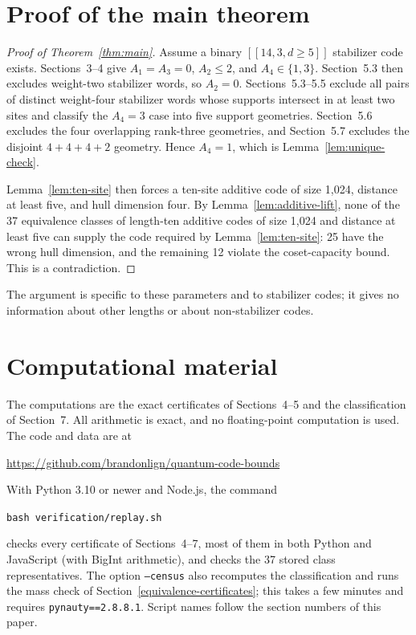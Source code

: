 \documentclass[11pt]{article}
\begin{document}
\section{Proof of the main theorem}\label{discussion-and-conclusion}

\begin{proof}[Proof of Theorem~\ref{thm:main}]
Assume a binary \(\left[\!\left[14,3,d\geq 5\right]\!\right]\) stabilizer code exists. Sections~3--4 give \(A_{1}=A_{3}=0\), \(A_{2}\leq2\), and \(A_{4}\in\{1,3\}\). Section~5.3 then excludes weight-two stabilizer words, so \(A_{2}=0\). Sections~5.3--5.5 exclude all pairs of distinct weight-four stabilizer words whose supports intersect in at least two sites and classify the \(A_4=3\) case into five support geometries. Section~5.6 excludes the four overlapping rank-three geometries, and Section~5.7 excludes the disjoint \(4+4+4+2\) geometry. Hence \(A_{4}=1\), which is Lemma~\ref{lem:unique-check}.

Lemma~\ref{lem:ten-site} then forces a ten-site additive code of size 1,024, distance at least five, and hull dimension four. By Lemma~\ref{lem:additive-lift}, none of the 37 equivalence classes of length-ten additive codes of size 1,024 and distance at least five can supply the code required by Lemma~\ref{lem:ten-site}: 25 have the wrong hull dimension, and the remaining 12 violate the coset-capacity bound. This is a contradiction.
\end{proof}

The argument is specific to these parameters and to stabilizer codes; it gives no information about other lengths or about non-stabilizer codes.

\section{Computational material}\label{computational-material}

The computations are the exact certificates of Sections~4--5 and the classification of Section~7. All arithmetic is exact, and no floating-point computation is used. The code and data are at
\begin{center}
\url{https://github.com/brandonlign/quantum-code-bounds}
\end{center}
With Python 3.10 or newer and Node.js, the command
\begin{center}
\texttt{bash verification/replay.sh}
\end{center}
checks every certificate of Sections~4--7, most of them in both Python and JavaScript (with BigInt arithmetic), and checks the 37 stored class representatives. The option \texttt{--census} also recomputes the classification and runs the mass check of Section~\ref{equivalence-certificates}; this takes a few minutes and requires \texttt{pynauty==2.8.8.1}. Script names follow the section numbers of this paper.
\end{document}
